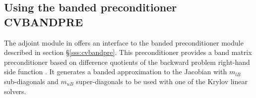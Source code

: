 \subsection{Using the banded preconditioner CVBANDPRE}

The adjoint module in {\cvodes} offers an interface to the banded 
preconditioner module {\cvbandpre} described in section \S\ref{sss:cvbandpre}.
This preconditioner provides a band matrix preconditioner based on difference
quotients of the backward problem right-hand side function . It generates
a banded approximation to the Jacobian with $m_{lB}$ sub-diagonals and $m_{uB}$
super-diagonals to be used with one of the Krylov linear solvers.

